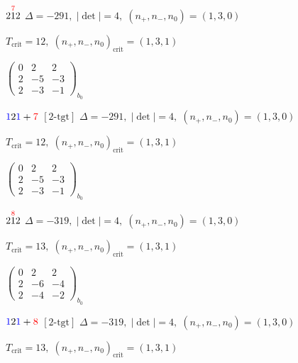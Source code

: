 \documentclass[10pt]{article}
\begin{document}
\smallskip

$2\overset{\textcolor{red}{7}}{1}2$ \quad $\Delta=-291,\; |\det|=4,\; (n_+,n_-,n_0)=(1,3,0)$

\hspace{1em}$T_{\text{crit}}=12,\; (n_+,n_-,n_0)_{\text{crit}}=(1,3,1)$

\hspace{2em}$\left(\begin{smallmatrix}0 & 2 & 2 \\ 2 & -5 & -3 \\ 2 & -3 & -1\end{smallmatrix}\right)_{\!b_0}$

\smallskip

$\textcolor{blue}{1}2\textcolor{blue}{1}+\textcolor{red}{7}$ $\scriptstyle [2\text{-tgt}]$ \quad $\Delta=-291,\; |\det|=4,\; (n_+,n_-,n_0)=(1,3,0)$

\hspace{1em}$T_{\text{crit}}=12,\; (n_+,n_-,n_0)_{\text{crit}}=(1,3,1)$

\hspace{2em}$\left(\begin{smallmatrix}0 & 2 & 2 \\ 2 & -5 & -3 \\ 2 & -3 & -1\end{smallmatrix}\right)_{\!b_0}$

\smallskip

$2\overset{\textcolor{red}{8}}{1}2$ \quad $\Delta=-319,\; |\det|=4,\; (n_+,n_-,n_0)=(1,3,0)$

\hspace{1em}$T_{\text{crit}}=13,\; (n_+,n_-,n_0)_{\text{crit}}=(1,3,1)$

\hspace{2em}$\left(\begin{smallmatrix}0 & 2 & 2 \\ 2 & -6 & -4 \\ 2 & -4 & -2\end{smallmatrix}\right)_{\!b_0}$

\smallskip

$\textcolor{blue}{1}2\textcolor{blue}{1}+\textcolor{red}{8}$ $\scriptstyle [2\text{-tgt}]$ \quad $\Delta=-319,\; |\det|=4,\; (n_+,n_-,n_0)=(1,3,0)$

\hspace{1em}$T_{\text{crit}}=13,\; (n_+,n_-,n_0)_{\text{crit}}=(1,3,1)$
\end{document}

